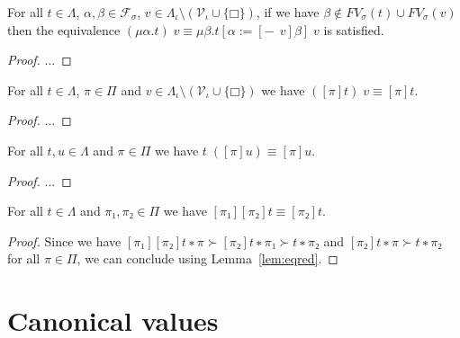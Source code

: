 \begin{theorem}
  For all $t ∈ Λ$, $α, β ∈ \mathcal{F}_{σ}$, $v ∈ Λ_{ι} \setminus
  (\mathcal{V}_{ι} ∪ \{□\})$, if we have $β \notin FV_σ(t) ∪ FV_σ(v)$ then
  the equivalence $(μα.t)\;v ≡ μβ.t[α := [{-}\;\,v]β]\;v$ is satisfied.
\end{theorem}
\begin{proof}
  ... %
\end{proof}

\begin{theorem}
  For all $t ∈ Λ$, $π ∈ Π$ and $v ∈ Λ_{ι} \setminus (\mathcal{V}_{ι} ∪ \{□\})$
  we have $([π]t)\;v ≡ [π]t$.
\end{theorem}
\begin{proof}
  ... %
\end{proof}

\begin{theorem}
  For all $t, u ∈ Λ$ and $π ∈ Π$ we have $t\;([π]u) ≡ [π]u$.
\end{theorem}
\begin{proof}
  ... %
\end{proof}

\begin{theorem}
  For all $t ∈ Λ$ and $π₁, π₂ ∈ Π$ we have $[π₁][π₂]t ≡ [π₂]t$.
\end{theorem}
\begin{proof}
  Since we have ${[π₁][π₂]t ∗ π} ≻ {[π₂]t ∗ π₁} ≻ {t ∗ π₂}$ and ${[π₂]t ∗ π} ≻
  {t ∗ π₂}$ for all $π ∈ Π$, we can conclude using Lemma~\ref{lem:eqred}.
\end{proof}

\section{Canonical values}

